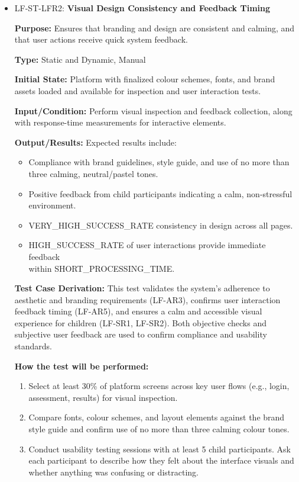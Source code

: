 \documentclass[12pt, titlepage]{article}
\begin{document}
\begin{itemize}
  \item LF-ST-LFR2: \textbf{Visual Design Consistency and Feedback Timing}
  \begin{mdframed}[linewidth=0.5mm] 
    \textbf{Purpose:} Ensures that branding and design are consistent and calming, and that user actions receive quick system feedback. \par
    \textbf{Type:} Static and Dynamic, Manual \par 
    \textbf{Initial State:} Platform with finalized colour schemes, fonts, and brand assets loaded and available for inspection and user interaction tests. \par 
    \textbf{Input/Condition:} Perform visual inspection and feedback collection, along with response-time measurements for interactive elements. \par 
    \textbf{Output/Results:} Expected results include: 
    \begin{itemize} 
      \item Compliance with brand guidelines, style guide, and use of no more than three calming, neutral/pastel tones. 
      \item Positive feedback from child participants indicating a calm, non-stressful environment. 
      \item VERY\_HIGH\_SUCCESS\_RATE consistency in design across all pages. 
      \item HIGH\_SUCCESS\_RATE of user interactions provide immediate feedback \\ within SHORT\_PROCESSING\_TIME. 
    \end{itemize} \par 
    \textbf{Test Case Derivation:} This test validates the system’s adherence to aesthetic and branding requirements (LF-AR3), confirms user interaction feedback timing (LF-AR5), and ensures a calm and accessible visual experience for children (LF-SR1, LF-SR2). Both objective checks and subjective user feedback are used to confirm compliance and usability standards. \par
    \textbf{How the test will be performed:} 
    \begin{enumerate}[noitemsep] 
      \item Select at least 30\% of platform screens across key user flows (e.g., login, assessment, results) for visual inspection.
      \item Compare fonts, colour schemes, and layout elements against the brand style guide and confirm use of no more than three calming colour tones.
      \item Conduct usability testing sessions with at least 5 child participants. Ask each participant to describe how they felt about the interface visuals and whether anything was confusing or distracting.

\end{enumerate}
\end{mdframed}
\end{itemize}
\end{document}

